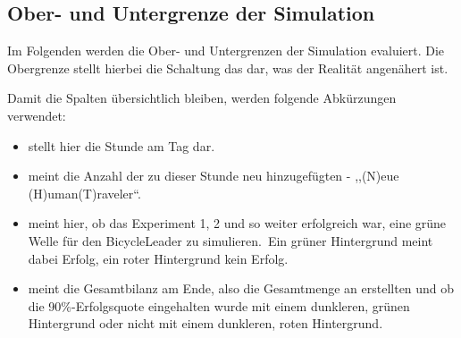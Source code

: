 %

\subsection{Ober- und Untergrenze der Simulation}\label{subsec:lower-upper-bound}

Im Folgenden werden die Ober- und Untergrenzen der Simulation evaluiert.
Die Obergrenze stellt hierbei die Schaltung  das dar, was der Realität angenähert ist.

Damit die Spalten übersichtlich bleiben, werden folgende Abkürzungen verwendet:
\begin{itemize}
    \item {} stellt hier die Stunde am Tag dar.
    \item {} meint die Anzahl der zu dieser Stunde neu hinzugefügten  - ,,(N)eue (H)uman(T)raveler``.
    \item {} meint hier, ob das Experiment 1, 2 und so weiter erfolgreich war, eine grüne Welle für den BicycleLeader zu simulieren.~Ein grüner Hintergrund meint dabei Erfolg, ein roter Hintergrund kein Erfolg.
    \item {} meint die Gesamtbilanz am Ende, also die Gesamtmenge an erstellten  und ob die 90\%-Erfolgsquote eingehalten wurde mit einem dunkleren, grünen Hintergrund oder nicht mit einem dunkleren, roten Hintergrund.
\end{itemize}

